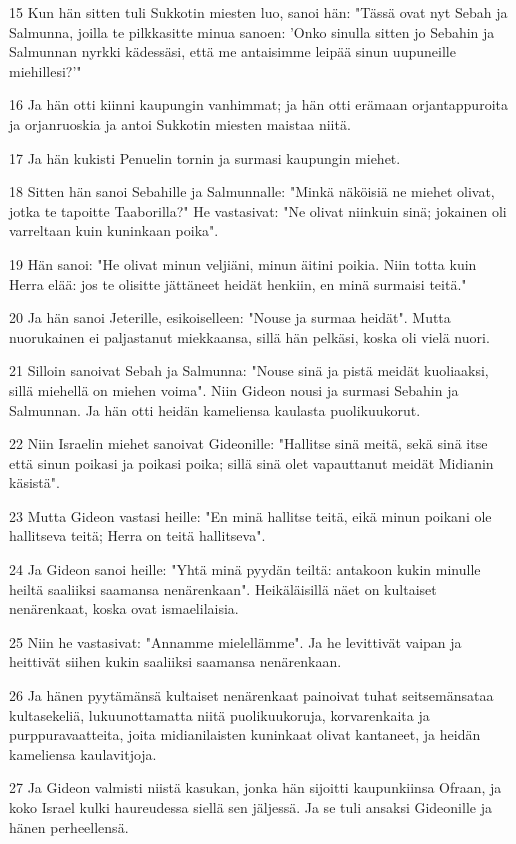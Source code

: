 \par 15 Kun hän sitten tuli Sukkotin miesten luo, sanoi hän: "Tässä ovat nyt Sebah ja Salmunna, joilla te pilkkasitte minua sanoen: 'Onko sinulla sitten jo Sebahin ja Salmunnan nyrkki kädessäsi, että me antaisimme leipää sinun uupuneille miehillesi?'"
\par 16 Ja hän otti kiinni kaupungin vanhimmat; ja hän otti erämaan orjantappuroita ja orjanruoskia ja antoi Sukkotin miesten maistaa niitä.
\par 17 Ja hän kukisti Penuelin tornin ja surmasi kaupungin miehet.
\par 18 Sitten hän sanoi Sebahille ja Salmunnalle: "Minkä näköisiä ne miehet olivat, jotka te tapoitte Taaborilla?" He vastasivat: "Ne olivat niinkuin sinä; jokainen oli varreltaan kuin kuninkaan poika".
\par 19 Hän sanoi: "He olivat minun veljiäni, minun äitini poikia. Niin totta kuin Herra elää: jos te olisitte jättäneet heidät henkiin, en minä surmaisi teitä."
\par 20 Ja hän sanoi Jeterille, esikoiselleen: "Nouse ja surmaa heidät". Mutta nuorukainen ei paljastanut miekkaansa, sillä hän pelkäsi, koska oli vielä nuori.
\par 21 Silloin sanoivat Sebah ja Salmunna: "Nouse sinä ja pistä meidät kuoliaaksi, sillä miehellä on miehen voima". Niin Gideon nousi ja surmasi Sebahin ja Salmunnan. Ja hän otti heidän kameliensa kaulasta puolikuukorut.
\par 22 Niin Israelin miehet sanoivat Gideonille: "Hallitse sinä meitä, sekä sinä itse että sinun poikasi ja poikasi poika; sillä sinä olet vapauttanut meidät Midianin käsistä".
\par 23 Mutta Gideon vastasi heille: "En minä hallitse teitä, eikä minun poikani ole hallitseva teitä; Herra on teitä hallitseva".
\par 24 Ja Gideon sanoi heille: "Yhtä minä pyydän teiltä: antakoon kukin minulle heiltä saaliiksi saamansa nenärenkaan". Heikäläisillä näet on kultaiset nenärenkaat, koska ovat ismaelilaisia.
\par 25 Niin he vastasivat: "Annamme mielellämme". Ja he levittivät vaipan ja heittivät siihen kukin saaliiksi saamansa nenärenkaan.
\par 26 Ja hänen pyytämänsä kultaiset nenärenkaat painoivat tuhat seitsemänsataa kultasekeliä, lukuunottamatta niitä puolikuukoruja, korvarenkaita ja purppuravaatteita, joita midianilaisten kuninkaat olivat kantaneet, ja heidän kameliensa kaulavitjoja.
\par 27 Ja Gideon valmisti niistä kasukan, jonka hän sijoitti kaupunkiinsa Ofraan, ja koko Israel kulki haureudessa siellä sen jäljessä. Ja se tuli ansaksi Gideonille ja hänen perheellensä.
